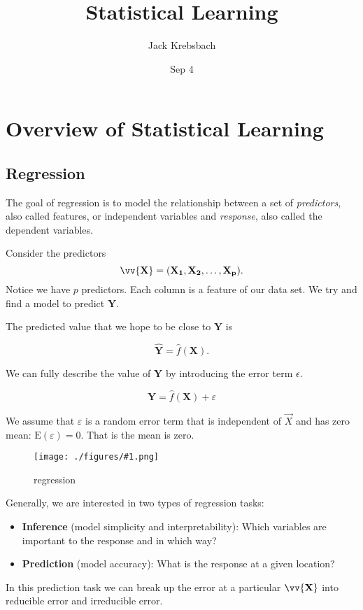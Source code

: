 \documentclass{report}
\title{Statistical Learning}
\author{Jack Krebsbach }
\date{Sep 4}
\newcommand{\incpng}[1]{
   \begin{figure}[ht]
    \centering
    \texttt{[image: ./figures/\#1.png]}
    \caption{#1}
    \label{fig:#1}
   \end{figure}
}
\begin{document}
\maketitle

\section{Overview of Statistical Learning}
\subsection{Regression}

The goal of regression is to model the relationship between a set of  \textit{predictors}, also called features, or independent variables and \textit{response}, also called the dependent variables.

\bigskip
\par
Consider the predictors $$ \vv{\mathbf{X}} = (\mathbf{X_{1}}, \mathbf{X_{2}},\dots ,\mathbf{X_{p}}).$$ Notice we have $p$ predictors. Each column is a feature of our data set. We try and find a model to predict $\mathbf{Y}.$

The predicted value that we hope to be close to $\mathbf{Y}$ is 

$$\hat{\mathbf{Y}}=\hat{f}(\mathbf{X}).$$

We can fully describe the value of $\mathbf{Y}$  by introducing the error term $\epsilon.$

$$\mathbf{Y}=\hat{f}(\mathbf{X})+\varepsilon$$

We assume that $\varepsilon$ is a random error term that is independent of $\vec{X}$ and has zero mean: $\mathrm{E}(\varepsilon)=0$. That is the mean is zero.

\incpng{regression}

Generally, we are interested in two types of regression tasks:

\begin{itemize}
  \item \textbf{Inference} (model simplicity and interpretability): Which variables are important to the response and in which way?  
  \item \textbf{Prediction} (model accuracy): What is the response at a given location?
\end{itemize}
\pagebreak

In this prediction task we can break up the error at a particular $\vv{\mathbf{X}}$ into reducible error and irreducible error. 
\end{document}
